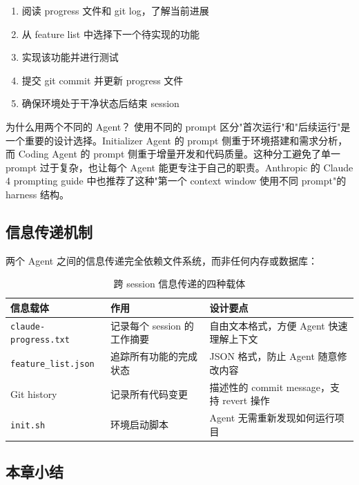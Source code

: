\documentclass[a4paper]{article}
\begin{document}
\begin{enumerate}
    \item 阅读 progress 文件和 git log，了解当前进展
    \item 从 feature list 中选择下一个待实现的功能
    \item 实现该功能并进行测试
    \item 提交 git commit 并更新 progress 文件
    \item 确保环境处于干净状态后结束 session
\end{enumerate}

\begin{knowledgebox}{为什么用两个不同的 Agent？}
使用不同的 prompt 区分"首次运行"和"后续运行"是一个重要的设计选择。Initializer Agent 的 prompt 侧重于环境搭建和需求分析，而 Coding Agent 的 prompt 侧重于增量开发和代码质量。这种分工避免了单一 prompt 过于复杂，也让每个 Agent 能更专注于自己的职责。Anthropic 的 Claude 4 prompting guide 中也推荐了这种"第一个 context window 使用不同 prompt"的 harness 结构。
\end{knowledgebox}

\subsection{信息传递机制}

两个 Agent 之间的信息传递完全依赖文件系统，而非任何内存或数据库：

\begin{table}[H]
\centering
\begin{tabular}{p{4cm}p{4cm}p{5cm}}
\toprule
\textbf{信息载体} & \textbf{作用} & \textbf{设计要点} \\
\midrule
\texttt{claude-progress.txt} & 记录每个 session 的工作摘要 & 自由文本格式，方便 Agent 快速理解上下文 \\
\midrule
\texttt{feature\_list.json} & 追踪所有功能的完成状态 & JSON 格式，防止 Agent 随意修改内容 \\
\midrule
Git history & 记录所有代码变更 & 描述性的 commit message，支持 revert 操作 \\
\midrule
\texttt{init.sh} & 环境启动脚本 & Agent 无需重新发现如何运行项目 \\
\bottomrule
\end{tabular}
\caption{跨 session 信息传递的四种载体}
\end{table}

\subsection{本章小结}
\end{document}
